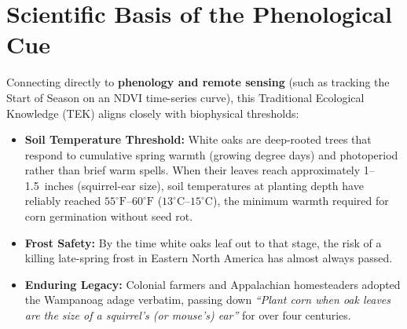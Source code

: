 \documentclass[11pt,a4paper]{article}
\begin{document}
\section{Scientific Basis of the Phenological Cue}
Connecting directly to \textbf{phenology and remote sensing} (such as tracking the Start of Season on an NDVI time-series curve), this Traditional Ecological Knowledge (TEK) aligns closely with biophysical thresholds:
\begin{itemize}[leftmargin=1.5em]
    \item \textbf{Soil Temperature Threshold:} White oaks are deep-rooted trees that respond to cumulative spring warmth (growing degree days) and photoperiod rather than brief warm spells. When their leaves reach approximately 1--1.5~inches (squirrel-ear size), soil temperatures at planting depth have reliably reached $55^\circ\text{F}$--$60^\circ\text{F}$ ($13^\circ\text{C}$--$15^\circ\text{C}$), the minimum warmth required for corn germination without seed rot.
    \item \textbf{Frost Safety:} By the time white oaks leaf out to that stage, the risk of a killing late-spring frost in Eastern North America has almost always passed.
    \item \textbf{Enduring Legacy:} Colonial farmers and Appalachian homesteaders adopted the Wampanoag adage verbatim, passing down \textit{``Plant corn when oak leaves are the size of a squirrel's (or mouse's) ear''} for over four centuries.
\end{itemize}
\end{document}
